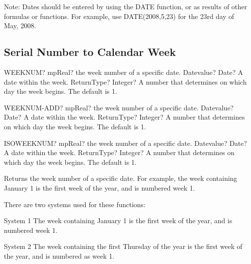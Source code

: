 \vspace{0.3cm}
Note: Dates should be entered by using the DATE function, or as results of other formulas or functions. For example, use DATE(2008,5,23) for the 23rd day of May, 2008.




\subsection{Serial Number to Calendar Week}

\begin{mpFunctionsExtract}
	\mpWorksheetFunctionTwoNotImplemented
	{WEEKNUM? mpReal? the week number of a specific date.}
	{Datevalue? Date? A date within the week. }
	{ReturnType? Integer? A number that determines on which day the week begins. The default is 1.}
\end{mpFunctionsExtract}


\vspace{0.3cm}

\begin{mpFunctionsExtract}
	\mpWorksheetFunctionTwoNotImplemented
	{WEEKNUM-ADD? mpReal? the week number of a specific date.}
	{Datevalue? Date? A date within the week. }
	{ReturnType? Integer? A number that determines on which day the week begins. The default is 1.}
\end{mpFunctionsExtract}


\vspace{0.3cm}

\begin{mpFunctionsExtract}
	\mpWorksheetFunctionTwoNotImplemented
	{ISOWEEKNUM? mpReal? the week number of a specific date.}
	{Datevalue? Date? A date within the week. }
	{ReturnType? Integer? A number that determines on which day the week begins. The default is 1.}
\end{mpFunctionsExtract}

\vspace{0.3cm}

Returns the week number of a specific date. For example, the week containing January 1 is the first week of the year, and is numbered week 1.

There are two systems used for these functions:

System 1  The week containing January 1 is the first week of the year, and is numbered week 1.

System 2  The week containing the first Thursday of the year is the first week of the year, and is numbered as week 1.

